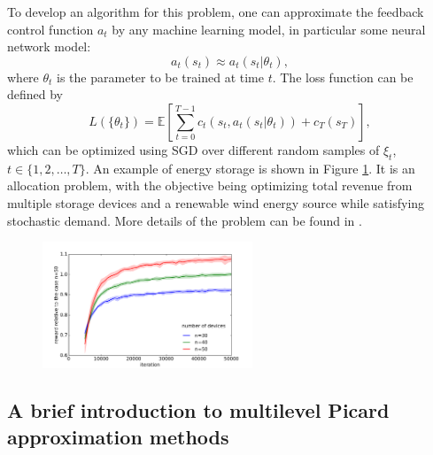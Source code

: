 \documentclass[12pt,AutoFakeBold,AutoFakeSlant]{article}
\theoremstyle{definition}
\begin{document}
	To develop an algorithm for this problem, one can  approximate the feedback control function $a_t$
	by any machine learning model, in particular some neural network model:
	\begin{equation}
		a_t(s_t)\approx a_t(s_t|\theta_t),
	\end{equation}
	where $\theta_t$ is the parameter to be trained at time $t$.
	The loss function can be defined by
	\begin{equation}
	L(\{\theta_t\}) =  \mathbb{E}\!\left[\sum_{t =0}^{T-1}c_t(s_t,a_t(s_t|\theta_t))+c_T(s_T) \right],
	\end{equation}
	which can be optimized using SGD over different random samples of $ \xi_t $, $ t \in \{ 1, 2, \dots, T \} $.
	An example of energy storage is shown in Figure \ref{fig:energystorage}.
	It is an allocation
	problem,  with the objective being optimizing total revenue from multiple storage devices and a renewable
	wind energy source while satisfying stochastic demand.
	More details of the problem can be found in \cite{HanE2016deepcontrol,jiang2015approximate}.



	\begin{figure}[!ht]
	\centering
	\includegraphics[width=0.56\textwidth]{./figs/energy_multi_reward}
	\label{fig:energystorage}
	\end{figure}


	\subsection{A brief introduction to multilevel Picard approximation methods}
	\label{sec:intro_MLP}
\end{document}
